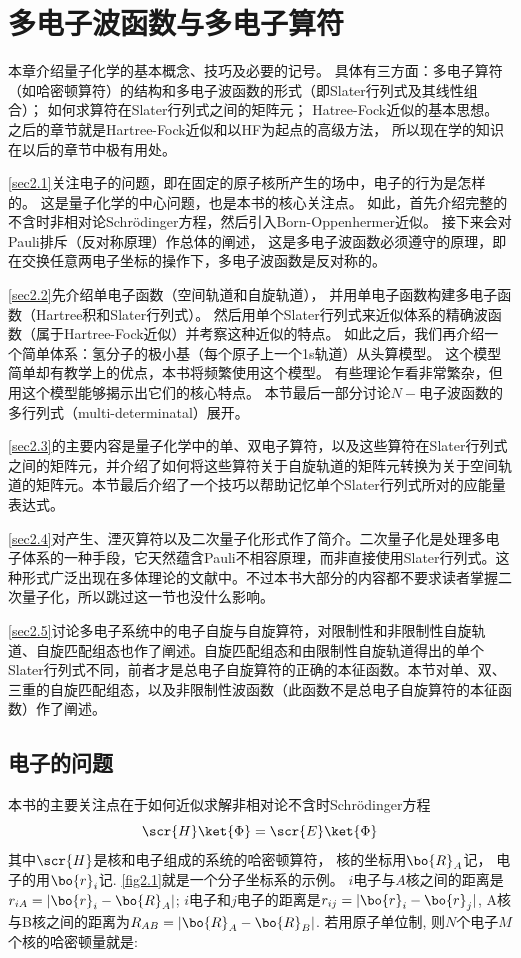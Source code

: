 
\chapter{多电子波函数与多电子算符}
\label{chap2}
本章介绍量子化学的基本概念、技巧及必要的记号。
具体有三方面：多电子算符（如哈密顿算符）的结构和多电子波函数的形式（即Slater行列式及其线性组合）；
如何求算符在Slater行列式之间的矩阵元；
Hatree-Fock近似的基本思想。
之后的章节就是Hartree-Fock近似和以HF为起点的高级方法，
所以现在学的知识在以后的章节中极有用处。


\autoref{sec2.1}关注电子的问题，即在固定的原子核所产生的场中，电子的行为是怎样的。
这是量子化学的中心问题，也是本书的核心关注点。
如此，首先介绍完整的不含时非相对论Schr\"odinger方程，然后引入Born-Oppenhermer近似。
接下来会对Pauli排斥（反对称原理）作总体的阐述，
这是多电子波函数必须遵守的原理，即在交换任意两电子坐标的操作下，多电子波函数是反对称的。

\autoref{sec2.2}先介绍单电子函数（空间轨道和自旋轨道），
并用单电子函数构建多电子函数（Hartree积和Slater行列式）。
然后用单个Slater行列式来近似体系的精确波函数（属于Hartree-Fock近似）并考察这种近似的特点。
如此之后，我们再介绍一个简单体系：氢分子的极小基（每个原子上一个1s轨道）从头算模型。
这个模型简单却有教学上的优点，本书将频繁使用这个模型。
有些理论乍看非常繁杂，但用这个模型能够揭示出它们的核心特点。
本节最后一部分讨论$N-$电子波函数的多行列式（multi-determinatal）展开。

\autoref{sec2.3}的主要内容是量子化学中的单、双电子算符，以及这些算符在Slater行列式之间的矩阵元，并介绍了如何将这些算符关于自旋轨道的矩阵元转换为关于空间轨道的矩阵元。本节最后介绍了一个技巧以帮助记忆单个Slater行列式所对的应能量表达式。

\autoref{sec2.4}对产生、湮灭算符以及二次量子化形式作了简介。二次量子化是处理多电子体系的一种手段，它天然蕴含Pauli不相容原理，而非直接使用Slater行列式。这种形式广泛出现在多体理论的文献中。不过本书大部分的内容都不要求读者掌握二次量子化，所以跳过这一节也没什么影响。

\autoref{sec2.5}讨论多电子系统中的电子自旋与自旋算符，对限制性和非限制性自旋轨道、自旋匹配组态也作了阐述。自旋匹配组态和由限制性自旋轨道得出的单个Slater行列式不同，前者才是总电子自旋算符的正确的本征函数。本节对单、双、三重的自旋匹配组态，以及非限制性波函数（此函数不是总电子自旋算符的本征函数）作了阐述。

\section{电子的问题}
\label{sec2.1}
本书的主要关注点在于如何近似求解非相对论不含时Schr\"odinger方程
\begin{equation}
\label{2.1}
\scr{H}\ket{\Phi}=\scr{E}\ket{\Phi}
\end{equation}
其中$\scr{H}$是核和电子组成的系统的哈密顿算符，
核的坐标用$\bo{R}_A$记，
电子的用$\bo{r}_i$记. 
\autoref{fig2.1}就是一个分子坐标系的示例。
$i$电子与$A$核之间的距离是$r_{iA}=|\bo{r}_i-\bo{R}_A|$; 
$i$电子和$j$电子的距离是$r_{ij}=|\bo{r}_i-\bo{r}_j|$, 
A核与B核之间的距离为$R_{AB}=|\bo{R}_A-\bo{R}_B|$.
若用原子单位制,
则$N$个电子$M$个核的哈密顿量就是:

